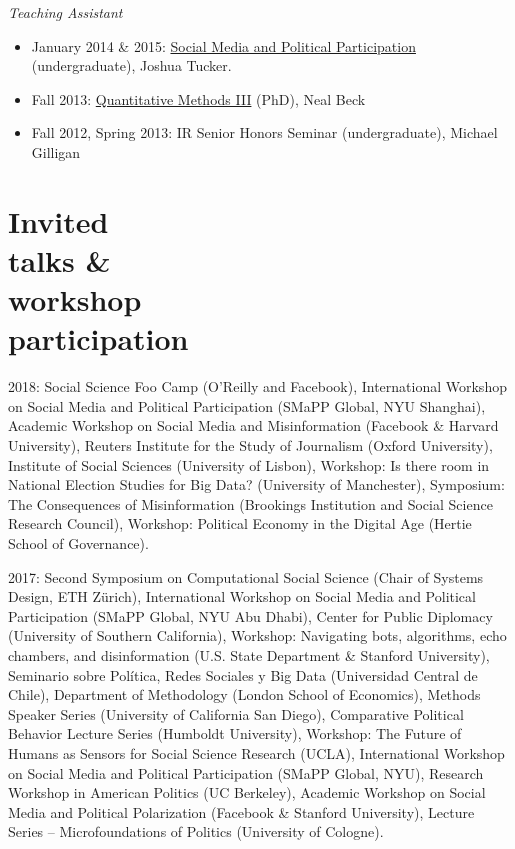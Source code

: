 \documentclass[margin,line,11pt]{resume}
\begin{document}
\begin{resume}
\emph{Teaching Assistant}
\begin{itemize}
\item January 2014 \& 2015: \href{https://github.com/pablobarbera/NYU-AD-160J}{Social Media and Political Participation} (undergraduate), Joshua Tucker.
\item Fall 2013: \href{https://github.com/pablobarbera/quant3materials}{Quantitative Methods III} (PhD), Neal Beck
\item Fall 2012, Spring 2013: IR Senior Honors Seminar (undergraduate), Michael Gilligan
\end{itemize}

    
    \newpage
    
        \section{\mysidestyle Invited\\talks \& \\workshop\\participation}
2018: Social Science Foo Camp (O'Reilly and Facebook), International Workshop on Social Media and Political Participation (SMaPP Global, NYU Shanghai), Academic Workshop on Social Media and Misinformation (Facebook \& Harvard University), Reuters Institute for the Study of Journalism (Oxford University), Institute of Social Sciences (University of Lisbon), Workshop: Is there room in National Election Studies for Big Data? (University of Manchester), Symposium: The Consequences of Misinformation (Brookings Institution and Social Science Research Council), Workshop: Political Economy in the Digital Age (Hertie School of Governance).
        
2017: Second Symposium on Computational Social Science (Chair of Systems Design, ETH Z\"{u}rich), International Workshop on Social Media and Political Participation (SMaPP Global, NYU Abu Dhabi), Center for Public Diplomacy (University of Southern California), Workshop: Navigating bots, algorithms, echo chambers, and disinformation (U.S. State Department \& Stanford University), Seminario sobre Pol\'{i}tica, Redes Sociales y Big Data (Universidad Central de Chile), Department of Methodology (London School of Economics), Methods Speaker Series (University of California San Diego), Comparative Political Behavior Lecture Series (Humboldt University), Workshop: The Future of Humans as Sensors for Social Science Research (UCLA),  International Workshop on Social Media and Political Participation (SMaPP Global, NYU), Research Workshop in American Politics (UC Berkeley), Academic Workshop on Social Media and Political Polarization (Facebook \& Stanford University),  Lecture Series -- Microfoundations of Politics (University of Cologne).


\end{resume}
\end{document}
